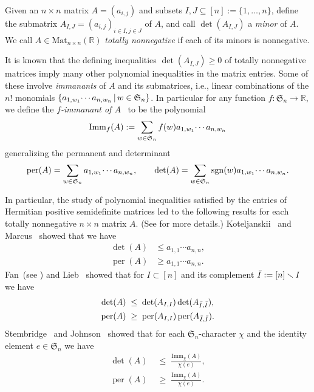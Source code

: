 \documentclass[12pt]{amsart}
\theoremstyle{definition}
\numberwithin{equation}{section}
\newcommand{\sn}{\mathfrak{S}_n}
\newcommand{\imm}[1]{\mathrm{Imm}_{#1}}
\newcommand{\defeq}{:=}
\newcommand{\sgn}{\mathrm{sgn}}
\newcommand{\ntnsp}{\negthinspace}
\newcommand{\mat}[1]{\mathrm{Mat}_{#1 \times #1}}
\DeclareMathOperator{\perm}{per}
\newcommand{\permmon}[2]{#1_{1,#2_1} \ntnsp\cdots #1_{n,#2_n}}
\newcommand{\ssm}{\smallsetminus}
\begin{document}
Given an $n \times n$ matrix $A = (a_{i,j})$
and subsets $I,J \subseteq [n] \defeq \{1,\dotsc,n\}$,
define the submatrix $A_{I,J} = (a_{i,j})_{i \in I, j \in J}$ of $A$,
and call $\det(A_{I,J})$ a {\em minor} of $A$.
We call $A \in \mat n(\mathbb R)$ {\em totally nonnegative}
if each of its minors is nonnegative.

It is known that the defining inequalities $\det(A_{I,J}) \geq 0$
of totally nonnegative matrices imply many other polynomial
inequalities in the matrix entries.
Some of these involve {\em immanants} of $A$ and its submatrices,
i.e., linear combinations of the $n!$ monomials
$\{ \permmon aw \,|\, w \in \sn \}$.
In particular for any
function $f: \sn \rightarrow \mathbb R$, we define
the {\em $f$-immanant of $A$}~\cite{StanPos} to be the polynomial
\begin{equation}\label{eq:immdef}
  \imm f(A) \defeq \sum_{w \in \sn} f(w) \permmon aw
\end{equation}
generalizing the permanent and determinant
\begin{equation*}
  \perm(A) = \sum_{w \in \sn} \permmon aw,
  \qquad
  \det(A) = \sum_{w \in \sn} \sgn(w) \permmon aw.
  \end{equation*}

In particular, the study of polynomial inequalities satisfied
by the entries of Hermitian positive semidefinite matrices
led to the following results for each totally nonnegative
$n \times n$ matrix $A$.
(See \cite[\S 1]{SkanSoskinBJArx} for more details.)
Koteljanskii~\cite{KotelProp} and Marcus~\cite{marcus1963perm}
showed that
we have
  \begin{align}
  \det(A) &\leq a_{1,1}\cdots a_{n,n},\label{eq:kotel1}\\
  \perm(A) &\geq a_{1,1}\cdots a_{n,n}.\label{eq:marcus}
  \end{align}
  Fan~(see \cite{carlson1967}) and Lieb~\cite{LiebPerm}
  showed that for $I\subset [n]$ and its complement $\Bar I \defeq [n] \ssm I$
  we have
  \begin{align}
    \det(A) &\;\leq\; \det(A_{I,I})\det(A_{\Bar I,\Bar I}), \label{eq:carlson}\\
    \perm(A) &\;\geq\; \perm(A_{I,I})\perm(A_{\Bar I,\Bar I}).\label{eq:lieb1}
\end{align}
  Stembridge~\cite{StemImm} and Johnson~\cite[p.\,1088]{StemConj}
  showed that for each $\sn$-character $\chi$ and the identity element
  $e \in \sn$
  we have
  \begin{align}
    \det(A) &\;\leq\; \frac{\imm\chi(A)}{\chi(e)},\label{eq:stemchar}\\
\perm(A) &\;\geq\; \frac{\imm\chi(A)}{\chi(e)}.\label{eq:johnsonchar}
\end{align}
\end{document}
